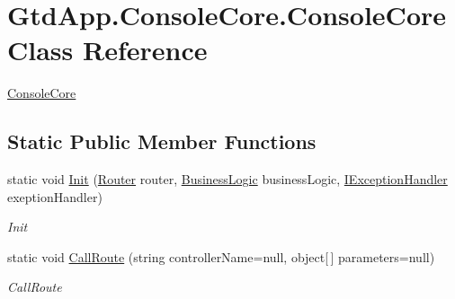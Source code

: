 \hypertarget{class_gtd_app_1_1_console_core_1_1_console_core}{}\section{Gtd\+App.\+Console\+Core.\+Console\+Core Class Reference}
\label{class_gtd_app_1_1_console_core_1_1_console_core}


\mbox{\hyperlink{class_gtd_app_1_1_console_core_1_1_console_core}{Console\+Core}}  


\subsection*{Static Public Member Functions}
\begin{DoxyCompactItemize}
\item 
static void \mbox{\hyperlink{class_gtd_app_1_1_console_core_1_1_console_core_afa9970b483de386eae4051ce5ee5ccc1}{Init}} (\mbox{\hyperlink{class_gtd_app_1_1_logic_1_1_routing_1_1_router}{Router}} router, \mbox{\hyperlink{class_gtd_app_1_1_logic_1_1_business_logic}{Business\+Logic}} business\+Logic, \mbox{\hyperlink{interface_gtd_app_1_1_console_core_1_1_interfaces_1_1_i_exception_handler}{I\+Exception\+Handler}} exeption\+Handler)
\begin{DoxyCompactList}\small\item\em Init \end{DoxyCompactList}\item 
static void \mbox{\hyperlink{class_gtd_app_1_1_console_core_1_1_console_core_a9605e55fa1a56275fd2d81fa5c628520}{Call\+Route}} (string controller\+Name=null, object\mbox{[}$\,$\mbox{]} parameters=null)
\begin{DoxyCompactList}\small\item\em Call\+Route \end{DoxyCompactList}\end{DoxyCompactItemize}
